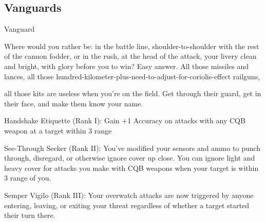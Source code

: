\subsection{Vanguards}
                                                   Vanguard

Where would you rather be: in the battle line, shoulder-to-shoulder with the rest of the cannon fodder, or in
the rush, at the head of the attack, your livery clean and bright, with glory before you to win? Easy answer.
All those missiles and lances, all those hundred-kilometer-plus-need-to-adjust-for-coriolis-effect railguns,

all those kits are useless when you’re on the field. Get through their guard, get in their face, and make them
know your name.

Handshake Etiquette (Rank I): Gain +1 Accuracy on attacks with any CQB weapon at a target
within 3 range

See-Through Seeker (Rank II): You’ve modified your sensors and ammo to punch through,
disregard, or otherwise ignore cover up close. You can ignore light and heavy cover for attacks
you make with CQB weapons when your target is within 3 range of you.

Semper Vigilo (Rank III): Your overwatch attacks are now triggered by anyone entering, leaving,
or exiting your threat regardless of whether a target started their turn there.
